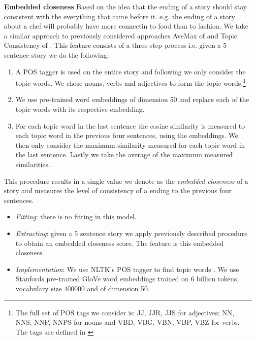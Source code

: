 \documentclass{article}
\begin{document}
\textbf{Embedded closeness} Based on the idea that the ending of a story should stay consistent with the everything that came before it. e.g. the ending of a story about a chef will probably have more connectin to food than to fashion. We take a similar approach to previously considered approaches AveMax of \cite{LSTMClassifier} and Topic Consistency of \cite{COGCOMP}.
This feature consists of a three-step process i.e. given a 5 sentence story we do the following:
\begin{enumerate}
	\item A POS tagger is used on the entire story and following \cite{COGCOMP} we only consider the topic words. We chose nouns, verbs and adjectives to form the topic words.\footnote{The full set of POS tags we consider is: JJ, JJR, JJS for adjectives; NN, NNS, NNP, NNPS for  nouns and VBD, VBG, VBN, VBP, VBZ for verbs. The tags are defined in \cite{TREEBANK}}
	\item We use pre-trained word embeddings of dimension 50 and replace each of the topic words with its respective embedding.
	\item For each topic word in the last sentence the cosine similarity is measured to each topic word in the previous four sentences, using the embeddings. We then only consider the maximum similarity measured for each topic word in the last sentence. Lastly we take the average of the maximum measured similarities. 
\end{enumerate}
This procedure results in a single value we denote as the \textit{embedded closeness} of a story and measures the level of consistency of a ending to the previous four sentences.
\begin{itemize}
	\item \textit{Fitting}: there is no fitting in this model.
	\item \textit{Extracting}: given a 5 sentence story we apply previously described procedure to obtain an embedded closeness score. The feature is this embedded closeness.
	\item \textit{Implementation}: We use NLTK's POS tagger to find topic words \cite{NLTK_VADER}. We use Stanfords pre-trained GloVe word embeddings \cite{GLOVE} trained on 6 billion tokens, vocabulary size 400000  and of dimension 50.
\end{itemize}
\end{document}
